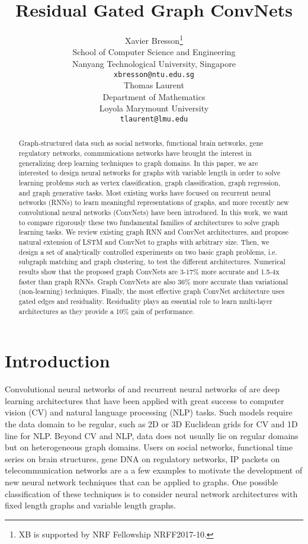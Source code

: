 \documentclass{article} \usepackage{iclr2018_conference,times}
\title{Residual Gated Graph ConvNets}
\author{Xavier Bresson\thanks{XB is supported by NRF Fellowship NRFF2017-10.}\\
School of Computer Science and Engineering\\
Nanyang Technological University, Singapore\\
\texttt{xbresson@ntu.edu.sg} \\
\And
Thomas Laurent \\
Department of Mathematics \\
Loyola Marymount University \\
\texttt{tlaurent@lmu.edu} 
}
\begin{document}
\maketitle

\begin{abstract}
Graph-structured data such as social networks, functional brain networks, gene regulatory networks, communications networks have brought the interest in generalizing deep learning techniques to graph domains. In this paper, we are interested to design neural networks for graphs with variable length in order to solve learning problems such as vertex classification, graph classification, graph regression, and graph generative tasks. Most existing works have focused on recurrent neural networks (RNNs) to learn meaningful representations of graphs, and more recently new convolutional neural networks (ConvNets) have been introduced. In this work, we want to compare rigorously these two fundamental families of architectures to solve graph learning tasks. We review existing graph RNN and ConvNet architectures, and propose natural extension of LSTM and ConvNet to graphs with arbitrary size. Then, we design a set of analytically controlled experiments on two basic graph problems, i.e. subgraph matching and graph clustering, to test the different architectures.  Numerical results show that the proposed graph ConvNets are 3-17\% more accurate and 1.5-4x faster than graph RNNs. Graph ConvNets are also 36\% more accurate than variational (non-learning) techniques. Finally, the most effective graph ConvNet architecture uses gated edges and residuality. Residuality plays an essential role to learn multi-layer architectures as they provide a 10\% gain of performance.
\end{abstract}



\section{Introduction}

Convolutional neural networks of \cite{pro:LeCunBottouBengioHaffner98MNIST} and recurrent neural networks of \cite{art:HochreiterSchmidhuber97LSTM} are deep learning architectures that have been applied with great success to computer vision (CV) and natural language processing (NLP) tasks. Such models require the data domain to be regular, such as 2D or 3D Euclidean grids for CV and 1D line for NLP. Beyond CV and NLP, data does not usually lie on regular domains but on heterogeneous graph domains. Users on social networks, functional time series on brain structures, gene DNA on regulatory networks, IP packets on telecommunication networks are a a few examples to motivate the development of new neural network techniques that can be applied to graphs. One possible classification of these techniques is to consider neural network architectures with fixed length graphs and variable length graphs. 
\end{document}
